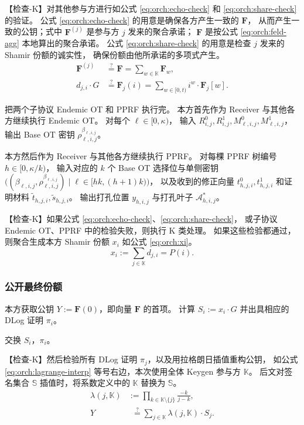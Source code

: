 【检查-K】对其他参与方进行如公式
\eqref{eq:orch:echo-check} 和 \eqref{eq:orch:share-check} 的验证。
公式 \eqref{eq:orch:echo-check} 的用意是确保各方产生一致的 $\mathbf{F}$，
从而产生一致的公钥；式中 $\mathbf{F}^{(j)}$ 是参与方 $j$ 发来的聚合承诺；
$\mathbf{F}$ 是按公式 \eqref{eq:orch:feld-agg} 本地算出的聚合承诺。
公式 \eqref{eq:orch:share-check} 的用意是检查 $j$ 发来的 Shamir 份额的诚实性，
确保份额由他所承诺的多项式产生。
\begin{align}
\label{eq:orch:echo-check}\tag{echo}
\mathbf{F}^{(j)} &\stackrel{?}{=}
\mathbf{F} = \sum_{w\in\mathbb{K}} \mathbf{F}_w, \\
\label{eq:orch:share-check}\tag{share}
d_{j,i} \cdot G &\stackrel{?}{=}
\mathbf{F}_j(i) = \sum_{w\in[0,t)} i^w \cdot \mathbf{F}_j[w].
\end{align}

把两个子协议 Endemic OT 和 PPRF 执行完。
本方首先作为 Receiver 与其他各方继续执行 Endemic OT。
对每个 $\ell\in[0, \kappa)$，
输入 $R_{i,j}^0, R_{i,j}^1, M_{\ell,i,j}^0, M_{\ell,i,j}^1$，
输出 Base OT 密钥 $\rho^{\beta_{\ell,i,j}}_{\ell,i,j}$。

本方然后作为 Receiver 与其他各方继续执行 PPRF。
对每棵 PPRF 树编号 $h\in[0, \kappa/k)$，
输入对应的 $k$ 个 Base OT 选择位与单侧密钥
$\bigl((\beta_{\ell,i,j},\rho^{\beta_{\ell,i,j}}_{\ell,i,j}) \mid \ell\in[hk,(h+1)k)\bigr)$，
以及收到的修正向量 $t^0_{h,j,i},t^1_{h,j,i}$ 和证明材料 $\tilde t_{h,j,i},\tilde s_{h,j,i}$。
输出打孔位置 $y_{h,i,j}$ 与打孔叶子 $\mathcal{A}^*_{h,i,j}$。

【检查-K】如果公式 \eqref{eq:orch:echo-check}、\eqref{eq:orch:share-check}，
或子协议 Endemic OT、PPRF 中的检验失败，则执行 K 类处理。
如果这些检验都通过，则聚合生成本方 Shamir 份额 $x_i$ 如公式 \eqref{eq:orch:xi}。
\begin{equation}
  \label{eq:orch:xi}
  \tag{xi}
  x_i := \sum_{j\in\mathbb{K}} d_{j,i} = P(i).
\end{equation}

\subsubsection{公开最终份额}

本方获取公钥 $Y := \mathbf{F}(0)$，即向量 $\mathbf{F}$ 的首项。
计算 $S_i := x_i \cdot G$ 并出具相应的 DLog 证明 $\pi_i$。

交换 $S_i$，$\pi_i$。

【检查-K】然后检验所有 DLog 证明 $\pi_j$，以及用拉格朗日插值重构公钥，
如公式 \eqref{eq:orch:lagrange-interp} 等号右边，本次使用全体 Keygen 参与方 $\mathbb K$。
后文对签名集合 $\mathbb S$ 插值时，将系数定义中的 $\mathbb K$ 替换为 $\mathbb S$。
\begin{align}
  \label{eq:orch:lagrange-coef}\tag{coef}
  \lambda(j,\mathbb{K}) &:= \prod_{k\in\mathbb{K}\setminus\{j\}} \frac{-k}{j - k}, \\
  \label{eq:orch:lagrange-interp}\tag{interp}
  Y &\phantom{:}\stackrel{?}{=} \sum_{j\in\mathbb{K}}\lambda(j,\mathbb{K}) \cdot S_j.
\end{align}

